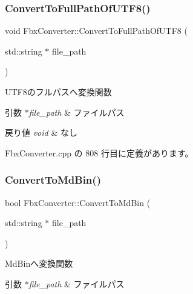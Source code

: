 \subsubsection{\texorpdfstring{Convert\+To\+Full\+Path\+Of\+U\+T\+F8()}{ConvertToFullPathOfUTF8()}}
{\footnotesize\ttfamily void Fbx\+Converter\+::\+Convert\+To\+Full\+Path\+Of\+U\+T\+F8 (\begin{DoxyParamCaption}\item[{std\+::string $\ast$}]{file\+\_\+path }\end{DoxyParamCaption})\hspace{0.3cm}{\ttfamily [private]}}



U\+T\+F8のフルパスへ変換関数 


\begin{DoxyParams}{引数}
{\em $\ast$file\+\_\+path} & ファイルパス \\
\hline
\end{DoxyParams}

\begin{DoxyRetVals}{戻り値}
{\em void} & なし \\
\hline
\end{DoxyRetVals}


 Fbx\+Converter.\+cpp の 808 行目に定義があります。

\mbox{\label{class_fbx_converter_aecd6ebf6aec9616bd609f6ebfc3a557e}} 
\subsubsection{\texorpdfstring{Convert\+To\+Md\+Bin()}{ConvertToMdBin()}}
{\footnotesize\ttfamily bool Fbx\+Converter\+::\+Convert\+To\+Md\+Bin (\begin{DoxyParamCaption}\item[{std\+::string $\ast$}]{file\+\_\+path }\end{DoxyParamCaption})}



Md\+Binへ変換関数 


\begin{DoxyParams}{引数}
{\em $\ast$file\+\_\+path} & ファイルパス \\
\hline
\end{DoxyParams}

